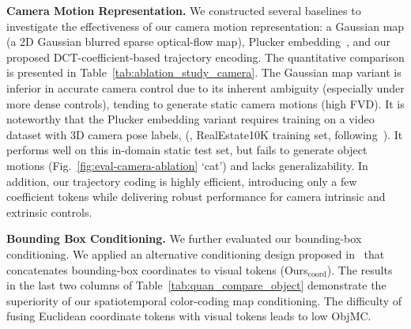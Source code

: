 

\textbf{Camera Motion Representation.} We constructed several baselines to investigate the effectiveness of our camera motion representation: a Gaussian map (a 2D Gaussian blurred sparse optical-flow map), Plucker embedding~\cite{he2024cameractrl,xu2024camco,bahmani2024vd3d}, and our proposed DCT-coefficient-based trajectory encoding. The quantitative comparison is presented in Table~\ref{tab:ablation_study_camera}. The Gaussian map variant is inferior in accurate camera control due to its inherent ambiguity (especially under more dense controls), tending to generate static camera motions (high FVD). It is noteworthy that the Plucker embedding variant requires training on a video dataset with 3D camera pose labels, (\ie, RealEstate10K training set, following~\cite{he2024cameractrl}). It performs well on this in-domain static test set, but fails to generate object motions (Fig.~\ref{fig:eval-camera-ablation} `cat') and lacks generalizability. In addition, our trajectory coding is highly efficient, introducing only a few coefficient tokens while delivering robust performance for camera intrinsic and extrinsic controls.

\noindent\textbf{Bounding Box Conditioning.} We further evaluated our bounding-box conditioning. We applied an alternative conditioning design proposed in~\cite{wang2024boximator} that concatenates bounding-box coordinates to visual tokens (Ours$_\text{coord}$). The results in the last two columns of Table~\ref{tab:quan_compare_object} demonstrate the superiority of our spatiotemporal color-coding map conditioning. The difficulty of fusing Euclidean coordinate tokens with visual tokens leads to low ObjMC.